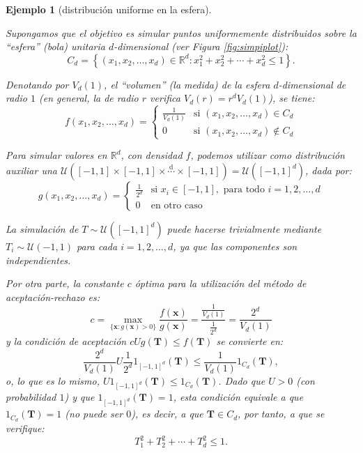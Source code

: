 \documentclass[
  10pt,
]{book}
\renewcommand{\mathbf}[1]{\symbf{#1}}
\theoremstyle{break}
\newtheorem{example}{Ejemplo}[chapter]
\theoremstyle{nonumberplain}
\begin{document}
\begin{example}[distribución uniforme en la esfera]
\protect\hypertarget{exm:ar-esfera}{}\label{exm:ar-esfera}

Supongamos que el objetivo es simular puntos uniformemente distribuidos sobre la ``esfera'' (bola) unitaria \(d\)-dimensional (ver Figura \ref{fig:simpiplot}):
\[C_d= \left\{  \left( x_1, x_2, \ldots, x_d \right) \in \mathbb{R}^d
: x_1^2 + x_2^2 + \cdots + x_d^2 \leq1 \right\}.\]

Denotando por \(V_d (1)\), el ``volumen'' (la medida) de la
esfera \(d\)-dimensional de radio \(1\) (en general, la de radio \(r\)
verifica \(V_d\left( r\right) = r^d V_d (1)\)), se tiene:
\[f\left( x_1,x_2,\ldots,x_d\right) = \left\{
\begin{array}{ll}
\frac{1}{V_d (1)  } & \text{si } \left( x_1, x_2, \ldots ,x_d\right)  \in C_d\\
0 & \text{si } \left( x_1,x_2,\ldots,x_d\right)  \notin C_d
\end{array} \right.\]

Para simular valores en \(\mathbb{R}^d\), con densidad \(f\),
podemos utilizar como distribución auxiliar una
\(\mathcal{U}\left( [-1, 1] \times [-1, 1] \times \overset{\text{d}}{\cdots} \times [-1, 1] \right) = \mathcal{U}\left( [-1, 1]^d\right)\), dada por:
\[g\left( x_1,x_2,\ldots,x_d\right) = \left\{
\begin{array}{ll}
\frac{1}{2^d} & \text{si } x_i \in [-1, 1], \text{ para todo }
i=1,2,\ldots,d\\
0 &  \text{en otro caso}
\end{array}\right.\]

La simulación de \(T \sim \mathcal{U}\left( [-1, 1]^d \right)\) puede hacerse trivialmente mediante \(T_i \sim \mathcal{U}\left( -1, 1 \right)\) para cada \(i=1,2,\ldots,d\), ya que las componentes son independientes.

Por otra parte, la constante \(c\) óptima para la utilización del método de aceptación-rechazo es:
\[c= \max_{\{\mathbf{x}:g(\mathbf{x}) > 0\}}
\frac{f(\mathbf{x})}{g(\mathbf{x})}
= \frac{\frac{1}{V_d (1)}}{\frac{1}{2^d}}
= \frac{2^d}{V_d (1)}\]
y la condición de aceptación \(cUg(\mathbf{T}) \leq f(\mathbf{T})\) se convierte en:
\[\frac{2^d}{V_d (1)}U\frac{1}{2^d}1_{[-1, 1]^d}(\mathbf{T})  \leq\frac{1}{V_d (1)}1_{C_d}(\mathbf{T}),\]
o, lo que es lo mismo,
\(U 1_{[-1, 1]^d}(\mathbf{T}) \leq 1_{C_d}(\mathbf{T})\).
Dado que \(U > 0\) (con probabilidad \(1\)) y que \(1_{[-1, 1]^d}(\mathbf{T}) = 1\), esta condición equivale a que \(1_{C_d}(\mathbf{T}) = 1\) (no puede ser \(0\)), es decir, a que \(\mathbf{T} \in C_d\), por tanto, a que se verifique:
\[T_1^2 + T_2^2 + \cdots + T_d^2 \leq 1.\]


\end{example}
\end{document}
